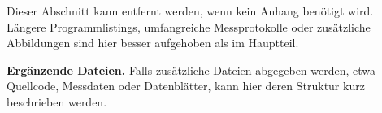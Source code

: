 
Dieser Abschnitt kann entfernt werden, wenn kein Anhang benötigt wird. Längere
Programmlistings, umfangreiche Messprotokolle oder zusätzliche Abbildungen sind
hier besser aufgehoben als im Hauptteil.

\textbf{Ergänzende Dateien.}
Falls zusätzliche Dateien abgegeben werden, etwa Quellcode, Messdaten oder
Datenblätter, kann hier deren Struktur kurz beschrieben werden.
